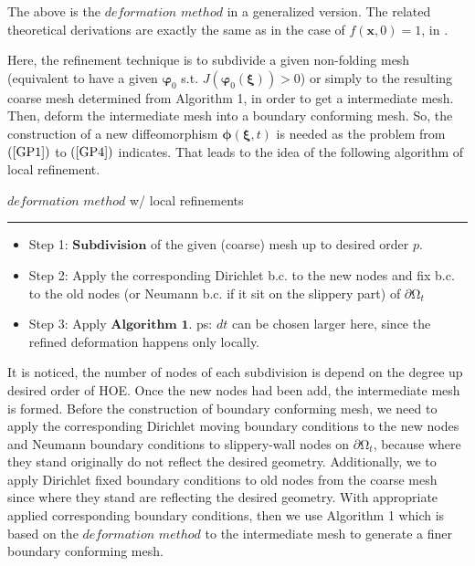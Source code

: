 \documentclass{article}
\theoremstyle{definition}
\theoremstyle{remark}
\numberwithin{equation}{section}
\numberwithin{subsection}{section}
\begin{document}
The above is the $deformation$ $method$ in a generalized version. The related theoretical derivations are exactly the same as in the case of $f(\pmb{x},0)=1$, in \cite{XiChen}.

Here, the refinement technique is to subdivide a given non-folding mesh (equivalent to have a given $\pmb{\varphi}_0$ s.t. $J(\pmb{\varphi}_0(\pmb{\xi}))>0$) or simply to the resulting coarse mesh determined from Algorithm 1, in order to get a intermediate mesh. Then, deform the intermediate mesh into a boundary conforming mesh. So, the construction of a new diffeomorphism $\pmb{\phi}(\pmb{\xi},t)$ is needed as the problem from $(\ref{GP1})$ to $(\ref{GP4})$ indicates. That leads to the idea of the following algorithm of local refinement. 

\begin{algorithm}
	\caption{$deformation$ $method$ w/ local refinements}
	\hrule %
	\begin{itemize}
		\item Step 1: $\mathbf{Subdivision}$ of the given (coarse) mesh up to desired order $p$. 
		
		\item Step 2: Apply the corresponding Dirichlet b.c. to the new nodes and fix b.c. to the old nodes (or Neumann b.c. if it sit on the slippery part) of $\partial\mathrm{\Omega}_t$
		   
		\item Step 3: Apply $\mathbf{Algorithm}$ $\mathbf{1}$. ps: $dt$ can be chosen larger here, since the refined deformation happens only locally. 
	\end{itemize}
\end{algorithm}

It is noticed, the number of nodes of each subdivision is depend on the degree up desired order of HOE. Once the new nodes had been add, the intermediate mesh is formed. Before the construction of boundary conforming mesh, we need to apply the corresponding Dirichlet moving boundary conditions to the new nodes and Neumann boundary conditions to slippery-wall nodes on $\partial\mathrm{\Omega}_t$, because where they stand originally do not reflect the desired geometry. Additionally, we to apply Dirichlet fixed boundary conditions to old nodes from the coarse mesh since where they stand are reflecting the desired geometry. With appropriate applied corresponding boundary conditions, then we use Algorithm 1 which is based on the $deformation$ $method$ to the intermediate mesh to generate a finer boundary conforming mesh. 
\end{document}
